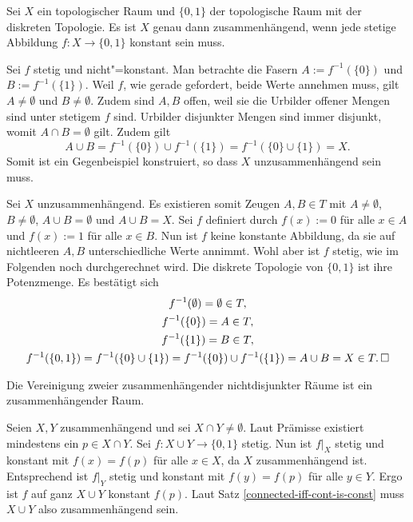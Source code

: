 \begin{Satz}\label{connected-iff-cont-is-const}
Sei $X$ ein topologischer Raum und $\{0,1\}$ der topologische
Raum mit der diskreten Topologie. Es ist $X$ genau dann
zusammenhängend, wenn jede stetige Abbildung $f\colon X\to\{0,1\}$
konstant sein muss.
\end{Satz}
\begin{Beweis}
Sei $f$ stetig und nicht"=konstant. Man betrachte die Fasern
$A:=f^{-1}(\{0\})$ und $B:=f^{-1}(\{1\})$. Weil $f$, wie gerade
gefordert, beide Werte annehmen muss, gilt $A\ne\emptyset$ und
$B\ne\emptyset$. Zudem sind $A,B$ offen, weil sie die Urbilder
offener Mengen sind unter stetigem $f$ sind. Urbilder disjunkter
Mengen sind immer disjunkt, womit $A\cap B=\emptyset$ gilt. Zudem gilt
\[A\cup B = f^{-1}(\{0\})\cup f^{-1}(\{1\}) = f^{-1}(\{0\}\cup \{1\}) = X.\]
Somit ist ein Gegenbeispiel konstruiert, so dass $X$ unzusammenhängend
sein muss.

Sei $X$ unzusammenhängend. Es existieren somit Zeugen $A,B\in T$
mit $A\ne\emptyset$, $B\ne\emptyset$, $A\cup B=\emptyset$ und
$A\cup B = X$. Sei $f$ definiert durch
$f(x):=0$ für alle $x\in A$ und $f(x):=1$ für alle $x\in B$.
Nun ist $f$ keine konstante Abbildung, da sie auf nichtleeren $A,B$
unterschiedliche Werte annimmt. Wohl aber ist $f$ stetig,
wie im Folgenden noch durchgerechnet wird. Die diskrete Topologie
von $\{0,1\}$ ist ihre Potenzmenge. Es bestätigt sich
\begin{gather*}
f^{-1}(\emptyset) = \emptyset\in T,\\
f^{-1}(\{0\}) = A\in T,\\
f^{-1}(\{1\}) = B\in T,\\
f^{-1}(\{0,1\}) = f^{-1}(\{0\}\cup\{1\}) = f^{-1}(\{0\})\cup f^{-1}(\{1\})
= A\cup B = X\in T.\,\square\\
\end{gather*}
\end{Beweis}

\begin{Satz}
Die Vereinigung zweier zusammenhängender nichtdisjunkter Räume
ist ein zusammenhängender Raum.
\end{Satz}
\begin{Beweis}
Seien $X,Y$ zusammenhängend und sei $X\cap Y\ne\emptyset$.
Laut Prämisse existiert mindestens ein $p\in X\cap Y$. Sei
$f\colon X\cup Y\to\{0,1\}$ stetig. Nun ist $f|_X$ stetig und
konstant mit $f(x)=f(p)$ für alle $x\in X$, da $X$ zusammenhängend
ist. Entsprechend ist $f|_Y$ stetig und konstant mit $f(y)=f(p)$
für alle $y\in Y$. Ergo ist $f$ auf ganz $X\cup Y$ konstant $f(p)$.
Laut Satz \ref{connected-iff-cont-is-const} muss $X\cup Y$
also zusammenhängend sein.\,\qedsymbol
\end{Beweis}

